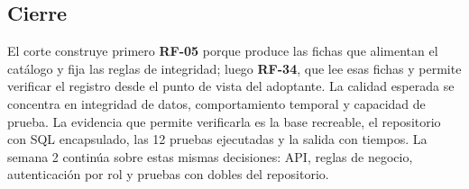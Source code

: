 \documentclass[11pt,a4paper]{article}
\begin{document}
\subsection{Cierre}

El corte construye primero \textbf{RF-05} porque produce las fichas que alimentan el
catálogo y fija las reglas de integridad; luego \textbf{RF-34}, que lee esas fichas y
permite verificar el registro desde el punto de vista del adoptante. La calidad esperada se
concentra en integridad de datos, comportamiento temporal y capacidad de prueba. La evidencia
que permite verificarla es la base recreable, el repositorio con SQL encapsulado, las 12 pruebas
ejecutadas y la salida con tiempos. La semana 2 continúa sobre estas mismas decisiones: API,
reglas de negocio, autenticación por rol y pruebas con dobles del repositorio.
\end{document}
